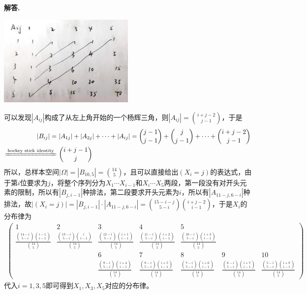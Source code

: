 \documentclass[12pt, a4paper, oneside]{ctexart}
\newenvironment{solution}{\par\noindent\textbf{解答. }}{\bigskip\par}
\begin{document}
\begin{solution}
    \centerline{
        \includegraphics[width=0.5\textwidth]{figure.jpg}
    }
    可以发现$|A_{ij}|$构成了从左上角开始的一个杨辉三角，则$|A_{ij}| = \binom{i+j-2}{j-1}$，于是
    \begin{equation*}
        \begin{aligned}
            |B_{ij}| =&\ |A_{1j}|+|A_{2j}| +\cdots +|A_{ij}| = \binom{j-1}{j-1}+\binom{j}{j-1}+\cdots+\binom{i+j-2}{j-1}\\
            \xlongequal{\text{hockey stick identity}}&\ \binom{i+j-1}{j}
        \end{aligned}
    \end{equation*}
    所以，总样本空间$|\Omega| = |B_{10,5}| = \binom{14}{5}$，且可以直接给出$(X_i=j)$的表达式，由于第$i$位要求为$j$，将整个序列分为$X_1\cdots X_{i-1}$和$X_i\cdots X_5$两段，第一段没有对开头元素的限制，所以有$|B_{j,i-1}|$种排法，第二段要求开头元素为$i$，所以有$|A_{11-j,6-i}|$种排法，故$|(X_i=j)| = |B_{j,i-1}|\cdot|A_{11-j,6-i}|=\binom{15-i-j}{5-i}\binom{i+j-2}{i-1}$，于是$X_i$的分布律为
    \begin{equation*}
        \begin{aligned}
            \left(\begin{matrix}
                1&2&3&4&5&&\\
                \frac{\binom{14-i}{5-i}\binom{i-1}{i-1}}{\binom{14}{5}}&\frac{\binom{13-i}{5-i}\binom{i}{i-1}}{\binom{14}{5}}&\frac{\binom{12-i}{5-i}\binom{i+1}{i-1}}{\binom{14}{5}}&\frac{\binom{11-i}{5-i}\binom{i+2}{i-1}}{\binom{14}{5}}&\frac{\binom{10-i}{5-i}\binom{i+3}{i-1}}{\binom{14}{5}}&&\\
                &&6&7&8&9&10\\
                &&\frac{\binom{9-i}{5-i}\binom{i+4}{i-1}}{\binom{14}{5}}&\frac{\binom{8-i}{5-i}\binom{i+5}{i-1}}{\binom{14}{5}}&\frac{\binom{7-i}{5-i}\binom{i+6}{i-1}}{\binom{14}{5}}&\frac{\binom{6-i}{5-i}\binom{i+7}{i-1}}{\binom{14}{5}}&\frac{\binom{5-i}{5-i}\binom{i+8}{i-1}}{\binom{14}{5}}
            \end{matrix}\right)
        \end{aligned}
    \end{equation*}
    代入$i=1,3,5$即可得到$X_1,X_3,X_5$对应的分布律。

\end{solution}
\end{document}
